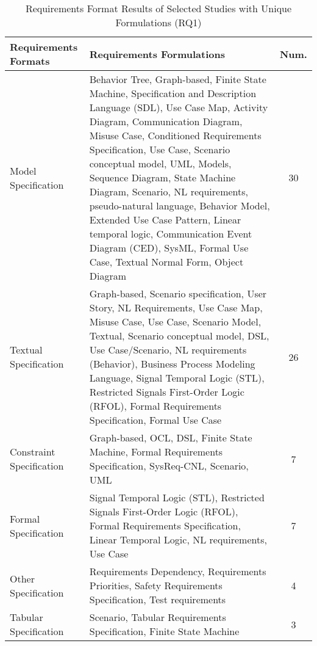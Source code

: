 \begin{table}[]
\small
\caption{Requirements Format Results of Selected Studies with Unique Formulations (RQ1)}
\label{table:req_form_unique}
\begin{tabularx}{\textwidth}{lXc}
\hline
\textbf{Requirements Formats}          & \textbf{Requirements Formulations}                                     &                 
\textbf{Num.} 
\\ \hline
Model Specification            &  Behavior Tree, Graph-based, Finite State Machine, Specification and Description Language (SDL), Use Case Map, Activity Diagram, Communication Diagram, Misuse Case, Conditioned Requirements Specification, Use Case, Scenario conceptual model, UML, Models, Sequence Diagram, State Machine Diagram, Scenario, NL requirements, pseudo-natural language, Behavior Model, Extended Use Case Pattern, Linear temporal logic, Communication Event Diagram (CED), SysML, Formal Use Case, Textual Normal Form, Object Diagram & \cellcolor{gray!50}30 \\
Textual Specification            & 
Graph-based, Scenario specification, User Story, NL Requirements, Use Case Map, Misuse Case, Use Case, Scenario Model, Textual, Scenario conceptual model, DSL, Use Case/Scenario, NL requirements (Behavior), Business Process Modeling Language, Signal Temporal Logic (STL), Restricted Signals First-Order Logic (RFOL), Formal Requirements Specification, Formal Use Case
& \cellcolor{gray!40}26 \\
Constraint Specification            & Graph-based, OCL, DSL, Finite State Machine, Formal Requirements Specification, SysReq-CNL, Scenario, UML & \cellcolor{gray!20}7 \\
Formal Specification            & Signal Temporal Logic (STL), Restricted Signals First-Order Logic (RFOL), Formal Requirements Specification, Linear Temporal Logic, NL requirements, Use Case & \cellcolor{gray!20}7 \\
Other Specification            & Requirements Dependency, Requirements Priorities, Safety Requirements Specification, Test requirements & \cellcolor{gray!10}4 \\
Tabular Specification            & Scenario, Tabular Requirements Specification, Finite State Machine & \cellcolor{gray!10}3 \\
\hline
\end{tabularx}%
\end{table}

